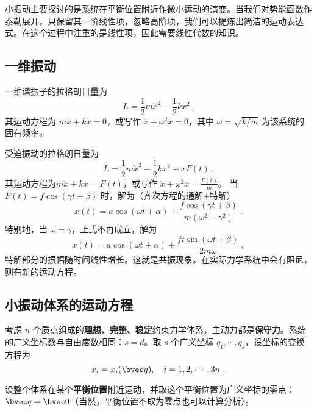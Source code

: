 

小振动主要探讨的是系统在平衡位置附近作微小运动的演变。当我们对势能函数作泰勒展开，只保留其一阶线性项，忽略高阶项，我们可以提炼出简洁的运动表达式。在这个过程中注重的是线性项，因此需要线性代数的知识。

\subsection{一维振动}
一维谐振子的拉格朗日量为
\begin{equation}
L=\frac{1}{2}m\dot{x}^2-\frac{1}{2}kx^2~.
\end{equation}
其运动方程为 $m\ddot {x}+kx=0$，或写作 $\ddot{x}+\omega^2 x=0$，其中 $\omega=\sqrt{k/m}$ 为该系统的固有频率。

受迫振动的拉格朗日量为 
\begin{equation}
L=\frac{1}{2}m\dot{x}^2-\frac{1}{2}kx^2+xF(t)~.
\end{equation}
其运动方程为$m\ddot{x}+kx=F(t)$，或写作 $\ddot{x}+\omega^2 x=\frac{F(t)}{m}$。
当 $F(t)=f\cos(\gamma t+\beta)$ 时，解为（齐次方程的通解+特解）
\begin{equation}
x(t)=a\cos(\omega t+\alpha)+\frac{f\cos(\gamma t+\beta)}{m(\omega^2-\gamma^2)}~.
\end{equation}
特别地，当 $\omega=\gamma$，上式不再成立，解为
\begin{equation}
x(t)=a \cos(\omega t+\alpha)+\frac{ft \sin(\omega t+\beta)}{2m\omega}~,
\end{equation}
特解部分的振幅随时间线性增长。这就是共振现象。在实际力学系统中会有阻尼，则有新的运动方程。

\subsection{小振动体系的运动方程}
考虑 $n$ 个质点组成的\textbf{理想、完整、稳定}约束力学体系，主动力都是\textbf{保守力}。系统的广义坐标数与自由度数相同：$s=d$。取 $s$ 个广义坐标 $q_1,\cdots,q_s$，设坐标的变换方程为
\begin{equation}
x_i = x_i(\bvec q),\ \ \  i=1,2,\cdots,3n~.
\end{equation}

设整个体系在某个\textbf{平衡位置}附近运动，并取这个平衡位置为广义坐标的零点：$\bvec q=\bvec 0$（当然，平衡位置不取为零点也可以计算分析）。


